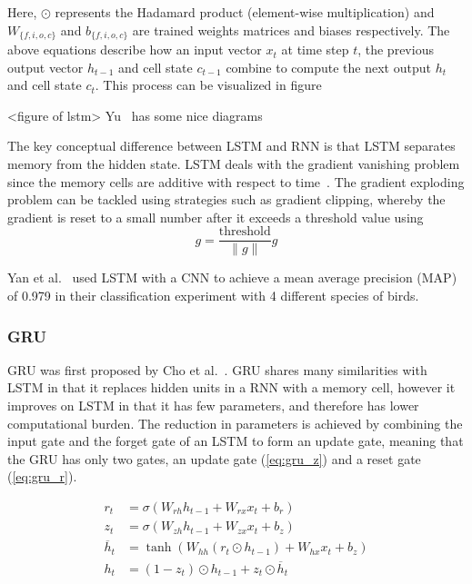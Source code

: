 Here, $\odot$ represents the Hadamard product (element-wise multiplication) and
$W_{\{f,i,o,c\}}$ and $b_{\{f,i,o,c\}}$ are trained weights matrices and biases
respectively. The above equations describe how an input vector $x_t$ at time
step $t$, the previous output vector $h_{t-1}$ and cell state $c_{t-1}$ combine
to compute the next output $h_t$ and cell state $c_t$. This process can be
visualized in figure 

<figure of lstm>
Yu~\cite{yu2019review} has some nice diagrams

The key conceptual difference between LSTM and RNN is that LSTM separates memory
from the hidden state. LSTM deals with the gradient vanishing problem since the
memory cells are additive with respect to time~\cite{daniluk2004automatic}. The
gradient exploding problem can be tackled using strategies such as gradient
clipping, whereby the gradient is reset to a small number after it exceeds a
threshold value using \begin{equation} g = \frac{\text{threshold}}{\|g\|}g
\end{equation}

Yan et al.~\cite{yan2021birdsong} used LSTM with a CNN to achieve a mean average
precision (MAP) of 0.979 in their classification experiment with 4 different
species of birds.

\subsubsection{GRU}

GRU was first proposed by Cho et al.~\cite{cho2014properties}. GRU shares many
similarities with LSTM in that it replaces hidden units in a RNN with a memory
cell, however it improves on LSTM in that it has few parameters, and therefore
has lower computational burden. The reduction in parameters is achieved by
combining the input gate and the forget gate of an LSTM to form an update gate,
meaning that the GRU has only two gates, an update gate (\ref{eq:gru_z}) and a
reset gate (\ref{eq:gru_r}).

\begin{align}
  r_t &= \sigma\left( W_{rh}h_{t-1} + W_{rx}x_t + b_r \right) \label{eq:gru_r} \\[0.5em]
  z_t &= \sigma\left( W_{zh}h_{t-1} + W_{zx}x_t + b_z \right) \label{eq:gru_z} \\[0.5em]
  \overline{h}_t &= \tanh\left( W_{hh}(r_t \odot h_{t-1}) + W_{hx}x_t + b_z \right) \\[0.5em]
  h_t &= (1-z_t) \odot h_{t-1} + z_t \odot \overline{h}_t
\end{align}

